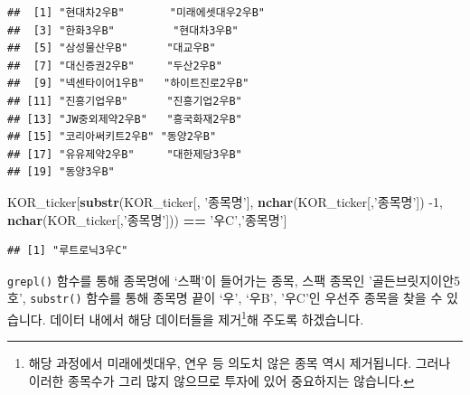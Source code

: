 \documentclass[12pt,]{book}
\newenvironment{Shaded}{\begin{snugshade}}{\end{snugshade}}
\newcommand{\DecValTok}[1]{\textcolor[rgb]{0.00,0.00,0.81}{#1}}
\newcommand{\KeywordTok}[1]{\textcolor[rgb]{0.13,0.29,0.53}{\textbf{#1}}}
\newcommand{\NormalTok}[1]{#1}
\newcommand{\OperatorTok}[1]{\textcolor[rgb]{0.81,0.36,0.00}{\textbf{#1}}}
\newcommand{\StringTok}[1]{\textcolor[rgb]{0.31,0.60,0.02}{#1}}
\let\rmarkdownfootnote\footnote%
\def\footnote{\protect\rmarkdownfootnote}
\begin{document}
\begin{verbatim}
##  [1] "현대차2우B"       "미래에셋대우2우B"
##  [3] "한화3우B"         "현대차3우B"      
##  [5] "삼성물산우B"      "대교우B"         
##  [7] "대신증권2우B"     "두산2우B"        
##  [9] "넥센타이어1우B"   "하이트진로2우B"  
## [11] "진흥기업우B"      "진흥기업2우B"    
## [13] "JW중외제약2우B"   "흥국화재2우B"    
## [15] "코리아써키트2우B" "동양2우B"        
## [17] "유유제약2우B"     "대한제당3우B"    
## [19] "동양3우B"
\end{verbatim}

\begin{Shaded}
\begin{Highlighting}[]
\NormalTok{KOR_ticker[}\KeywordTok{substr}\NormalTok{(KOR_ticker[, }\StringTok{'종목명'}\NormalTok{],}
                  \KeywordTok{nchar}\NormalTok{(KOR_ticker[,}\StringTok{'종목명'}\NormalTok{]) }\DecValTok{-1}\NormalTok{,}
                  \KeywordTok{nchar}\NormalTok{(KOR_ticker[,}\StringTok{'종목명'}\NormalTok{])) }\OperatorTok{==}\StringTok{ '우C'}\NormalTok{,}\StringTok{'종목명'}\NormalTok{] }
\end{Highlighting}
\end{Shaded}

\begin{verbatim}
## [1] "루트로닉3우C"
\end{verbatim}

\texttt{grepl()} 함수를 통해 종목명에 `스팩'이 들어가는 종목, 스팩 종목인 '골든브릿지이안5호', \texttt{substr()} 함수를 통해 종목명 끝이 `우', `우B', '우C'인 우선주 종목을 찾을 수 있습니다. 데이터 내에서 해당 데이터들을 제거\footnote{해당 과정에서 미래에셋대우, 연우 등 의도치 않은 종목 역시 제거됩니다. 그러나 이러한 종목수가 그리 많지 않으므로 투자에 있어 중요하지는 않습니다.}해 주도록 하겠습니다.
\end{document}
